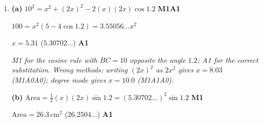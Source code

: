 \documentclass[12pt, twoside]{article}
\begin{document}
\begin{enumerate}[itemsep=0.3cm]
\textbf{(a)} $AB^{2} = 14^{2} + 9^{2} - 2(14)(9)\cos 118^\circ$ \hfill \textbf{M1A1}

$AB^{2} = 395.306\ldots$

$AB = 19.9\,\text{km}$ \quad ($19.8823\ldots$) \hfill \textbf{A1}

\emph{M1 for the cosine rule, A1 for the correct substitution. Wrong method:
adding $2(14)(9)\cos 118^\circ$ gives $12.6$: M1A0A0. The answer must be
greater than $14$, the longest given side, because $118^\circ$ is the
largest angle.}

\textbf{(b)} $\dfrac{\sin H\hat{A}B}{9} = \dfrac{\sin 118^\circ}{19.8823\ldots}$ \hfill \textbf{M1}

$H\hat{A}B = 23.6^\circ$ \quad ($23.5580\ldots$) \hfill \textbf{A1}

\emph{M1 for pairing $HB = 9$ with $H\hat{A}B$. Wrong method: pairing $14$
with $H\hat{A}B$ gives $38.4^\circ$, which is $H\hat{B}A$: M0A0. Accept the
cosine rule. Accept $23.5$ from the rounded $AB = 19.9$. FT from (a).}

\textbf{(c)} $\text{Area} = \frac{1}{2}(14)(9)\sin 118^\circ$ \hfill \textbf{M1}

$\text{Area} = 55.6\,\text{km}^{2}$ \quad ($55.6256\ldots$) \hfill \textbf{A1}

\emph{Accept any two sides with the angle between them. Wrong method:
$\frac{1}{2}(14)(9) = 63$ earns M0A0.}

\newpage

\item[3.] [Maximum mark: 7]

\textbf{(a)} $10^{2} = x^{2} + (2x)^{2} - 2(x)(2x)\cos 1.2$ \hfill \textbf{M1A1}

$100 = x^{2}\left(5 - 4\cos 1.2\right) = 3.55056\ldots x^{2}$

$x = 5.31$ \quad ($5.30702\ldots$) \hfill \textbf{A1}

\emph{M1 for the cosine rule with $BC = 10$ opposite the angle $1.2$; A1 for
the correct substitution. Wrong methods: writing $(2x)^{2}$ as $2x^{2}$
gives $x = 8.03$ (M1A0A0); degree mode gives $x = 10.0$ (M1A1A0).}

\textbf{(b)} $\text{Area} = \frac{1}{2}(x)(2x)\sin 1.2 = (5.30702\ldots)^{2}\sin 1.2$ \hfill \textbf{M1}

$\text{Area} = 26.3\,\text{cm}^{2}$ \quad ($26.2504\ldots$) \hfill \textbf{A1}


\end{enumerate}
\end{document}
